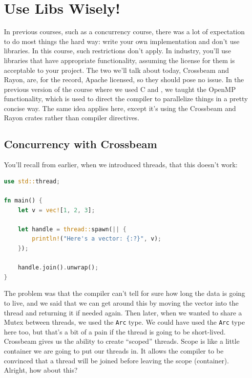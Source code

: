 




\section*{Use Libs Wisely!}
In previous courses, such as a concurrency course, there was a lot of expectation to do most things the hard way: write your own implementation and don't use libraries. In this course, such restrictions don't apply. In industry, you'll use libraries that have appropriate functionality, assuming the license for them is acceptable to your project. The two we'll talk about today, Crossbeam and Rayon, are, for the record, Apache licensed, so they should pose no issue. In the previous version of the course where we used C and \CPP, we taught the OpenMP functionality, which is used to direct the compiler to parallelize things in a pretty concise way. The same idea applies here, except it's using the Crossbeam and Rayon crates rather than compiler directives.


\subsection*{Concurrency with Crossbeam} 

You'll recall from earlier, when we introduced threads, that this doesn't work:
\begin{lstlisting}[language=Rust]
use std::thread;

fn main() {
    let v = vec![1, 2, 3];

    let handle = thread::spawn(|| {
        println!("Here's a vector: {:?}", v);
    });

    handle.join().unwrap();
}
\end{lstlisting}

The problem was that the compiler can't tell for sure how long the data is going to live, and we said that we can get around this by moving the vector into the thread and returning it if needed again. Then later, when we wanted to share a Mutex between threads, we used the \texttt{Arc} type. We could have used the \texttt{Arc} type here too, but that's a bit of a pain if the thread is going to be short-lived. Crossbeam gives us the ability to create ``scoped'' threads. Scope is like a little container we are going to put our threads in. It allows the compiler to be convinced that a thread will be joined before leaving the scope (container). Alright, how about this?

